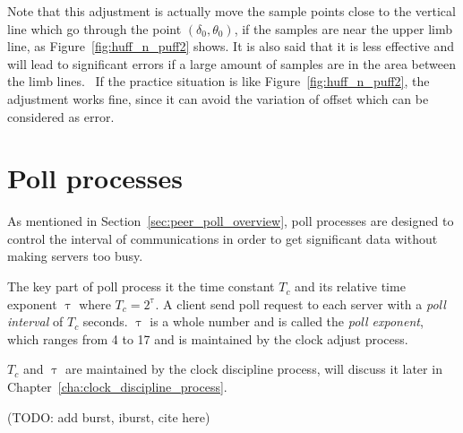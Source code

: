 

Note that this adjustment is actually move the sample points close to the
vertical line which go through the point $(\delta_0, \theta_0)$, if the samples
are near the upper limb line, as Figure~\ref{fig:huff_n_puff2} shows. It is
also said that it is less effective and will lead to significant errors if a
large amount of samples are in the area between the limb
lines.~\cite{huff_n_puff} If the practice situation is like
Figure~\ref{fig:huff_n_puff2}, the adjustment works fine, since it can
avoid the variation of offset which can be considered as error.


\section{Poll processes}%
\label{sec:poll_processes}
As mentioned in Section~\ref{sec:peer_poll_overview}, poll processes are
designed to control the interval of communications in order to get significant
data without making servers too busy. 

The key part of poll process it the time constant $T_c$ and its relative time
exponent $\uptau$ where $T_c = 2 ^ {\uptau}$. A client send poll request to
each server with a \emph{poll interval} of $T_c$ seconds. $\uptau$ is a whole
number and is called the \emph{poll exponent}, which ranges from 4 to 17 and is
maintained by the clock adjust process. 

$T_c$ and $\uptau$ are maintained by the clock discipline process, will discuss
it later in Chapter~\ref{cha:clock_discipline_process}.

(TODO: add burst, iburst, cite here)



